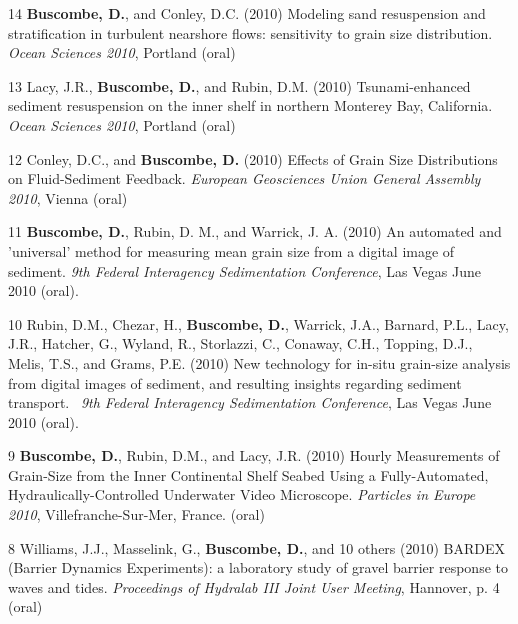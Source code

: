 \documentclass[margin,line]{resume}
\begin{document}
\begin{resume}
\begin{footnotesize}
\begin{list1}
	\item[14] {\bf Buscombe, D.}, and Conley, D.C. (2010) Modeling sand resuspension and stratification in turbulent nearshore flows: sensitivity to grain size distribution. {\sl Ocean Sciences 2010}, Portland (oral)\\

	\item[13] Lacy, J.R., {\bf Buscombe, D.}, and Rubin, D.M. (2010) Tsunami-enhanced sediment resuspension on the inner shelf in northern Monterey Bay, California. {\sl Ocean Sciences 2010}, Portland (oral)\\

	\item[12] Conley, D.C., and {\bf Buscombe, D.} (2010) Effects of Grain Size Distributions on Fluid-Sediment Feedback. {\sl European Geosciences Union General Assembly 2010}, Vienna (oral)\\

	\item[11] {\bf Buscombe, D.}, Rubin, D. M., and Warrick, J. A. (2010) An automated and 'universal' method for measuring mean grain size from a digital image of sediment. {\sl 9th Federal Interagency Sedimentation Conference}, Las Vegas June 2010 (oral).\\

	\item[10] Rubin, D.M., Chezar, H., {\bf Buscombe, D.}, Warrick, J.A., Barnard, P.L., Lacy, J.R., Hatcher, G., Wyland, R., Storlazzi, C., Conaway, C.H., Topping, D.J., Melis, T.S., and Grams, P.E. (2010) New technology for in-situ grain-size analysis from digital images of sediment, and resulting insights regarding sediment transport.  {\sl 9th Federal Interagency Sedimentation Conference}, Las Vegas June 2010 (oral).\\

	\item[9] {\bf Buscombe, D.}, Rubin, D.M., and Lacy, J.R. (2010) Hourly Measurements of Grain-Size from the Inner Continental Shelf Seabed Using a Fully-Automated, Hydraulically-Controlled Underwater Video Microscope. {\sl Particles in Europe 2010}, Villefranche-Sur-Mer, France. (oral)\\

	\item[8] Williams, J.J., Masselink, G., {\bf Buscombe, D.}, and 10 others (2010) BARDEX (Barrier Dynamics Experiments): a laboratory study of gravel barrier response to waves and tides. {\sl Proceedings of Hydralab III Joint User Meeting}, Hannover, p. 4 (oral)
	\end{list1}
	

\end{footnotesize}
\end{resume}
\end{document}
